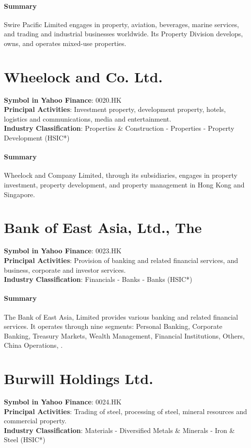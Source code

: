 \paragraph{Summary}
Swire Pacific Limited engages in property, aviation, beverages, marine services, and trading and industrial businesses worldwide. Its Property Division develops, owns, and operates mixed-use properties.


\section{Wheelock and Co. Ltd.}
\textbf{Symbol in Yahoo Finance}: 0020.HK\\
\textbf{Principal Activities}: Investment property, development property, hotels, logistics and communications, media and entertainment.\\
\textbf{Industry Classification}: Properties \& Construction - Properties - Property Development (HSIC*)
\paragraph{Summary}
Wheelock and Company Limited, through its subsidiaries, engages in property investment, property development, and property management in Hong Kong and Singapore.


\section{Bank of East Asia, Ltd., The}
\textbf{Symbol in Yahoo Finance}: 0023.HK\\
\textbf{Principal Activities}: Provision of banking and related financial services, and business, corporate and investor services.\\
\textbf{Industry Classification}: Financials - Banks - Banks (HSIC*)
\paragraph{Summary}
The Bank of East Asia, Limited provides various banking and related financial services. It operates through nine segments: Personal Banking, Corporate Banking, Treasury Markets, Wealth Management, Financial Institutions, Others, China Operations, .


\section{Burwill Holdings Ltd.}
\textbf{Symbol in Yahoo Finance}: 0024.HK\\
\textbf{Principal Activities}: Trading of steel, processing of steel, mineral resources and commercial property.\\
\textbf{Industry Classification}: Materials - Diversified Metals \& Minerals - Iron \& Steel (HSIC*)
